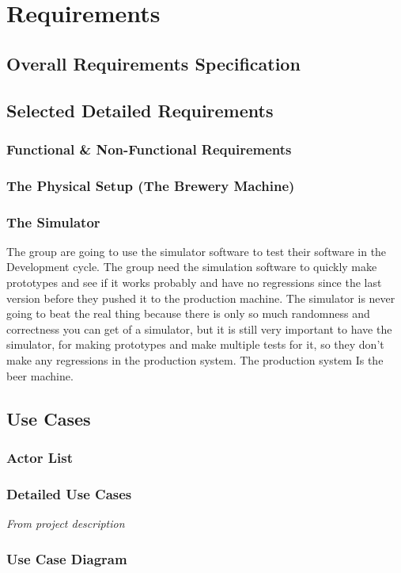 \section{Requirements}

\subsection{Overall Requirements Specification}

\subsection{Selected Detailed Requirements}

\subsubsection{Functional \& Non-Functional Requirements}

\subsubsection{The Physical Setup (The Brewery Machine)}

\subsubsection{The Simulator}
The group are going to use the simulator software to test their software in the 
Development cycle. 
The group need the simulation software to quickly make prototypes and see if it
works probably and have no regressions since the last version before they pushed
it to the production machine.
The simulator is never going to beat the real thing because there is only
so much randomness and correctness you can get of a simulator, but it is still
very important to have the simulator, for making prototypes and make multiple
tests for it, so they don't make any regressions in the production system. 
The production system Is the beer machine.

\subsection{Use Cases}

\subsubsection{Actor List}

\subsubsection{Detailed Use Cases}
\textit{From project description}

\subsubsection{Use Case Diagram}
